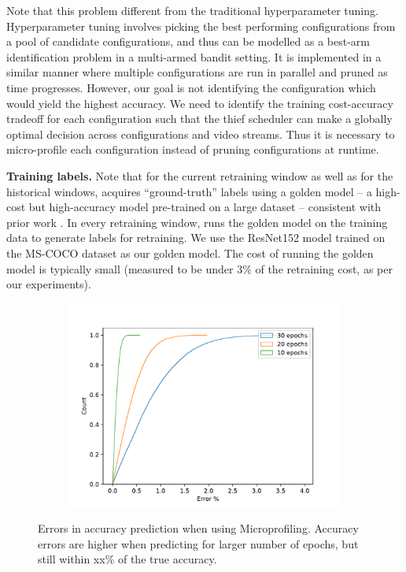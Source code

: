 
Note that this problem different from the traditional hyperparameter tuning\cite{hyperband, asha}. Hyperparameter tuning involves picking the best performing configurations from a pool of candidate configurations, and thus can be modelled as a best-arm identification problem in a multi-armed bandit setting. It is implemented in a similar manner where multiple configurations are run in parallel and pruned as time progresses. However, our goal is not identifying the configuration which would yield the highest accuracy. We need to identify the training cost-accuracy tradeoff for each configuration such that the thief scheduler can make a globally optimal decision across configurations and video streams. Thus it is necessary to micro-profile each configuration instead of pruning configurations at runtime. 

{\bf Training labels.} Note that for the current retraining window as well as for the historical windows, {\name} acquires ``ground-truth'' labels using a golden model -- a high-cost but high-accuracy model pre-trained on a large dataset -- consistent with prior work \cite{incremental-13, mullapudi2019, incremental-15, distribution-20}. In every retraining window, {\name} runs the golden model on the training data to generate labels for retraining. We use the ResNet152 model trained on the MS-COCO dataset as our golden model. The cost of running the golden model is typically small (measured to be under $3\%$ of the retraining cost, as per our experiments).

\begin{figure}
  \centering
  \begin{subfigure}[t]{\linewidth}
    \centering
    \includegraphics[width=0.9\linewidth]{results/microprofiling_dummy.pdf}
  \end{subfigure}
  \caption{Errors in accuracy prediction when using Microprofiling. Accuracy errors are higher when predicting for larger number of epochs, but still within xx\% of the true accuracy.}
  \label{fig:multicam-cities}
\end{figure}

